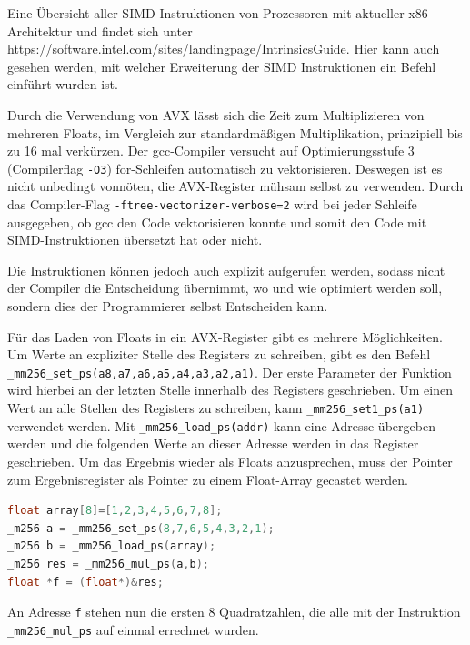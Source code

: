 \documentclass[../main.tex]{subfiles}
\begin{document}
Eine Übersicht aller SIMD-Instruktionen von Prozessoren mit aktueller x86-Architektur und findet sich unter \url{https://software.intel.com/sites/landingpage/IntrinsicsGuide}. Hier kann auch gesehen werden, mit welcher Erweiterung der SIMD Instruktionen ein Befehl einführt wurden ist.

Durch die Verwendung von AVX lässt sich die Zeit zum Multiplizieren von mehreren Floats, im Vergleich zur standardmäßigen Multiplikation, prinzipiell bis zu 16 mal verkürzen. Der gcc-Compiler versucht auf Optimierungsstufe 3 (Compilerflag \texttt{-O3}) for-Schleifen automatisch zu vektorisieren. Deswegen ist es nicht unbedingt vonnöten, die AVX-Register mühsam selbst zu verwenden. Durch das Compiler-Flag \texttt{-ftree-vectorizer-verbose=2} wird bei jeder Schleife ausgegeben, ob gcc den Code vektorisieren konnte und somit den Code mit SIMD-Instruktionen übersetzt hat oder nicht.

Die Instruktionen können jedoch auch explizit aufgerufen werden, sodass nicht der Compiler die Entscheidung übernimmt, wo und wie optimiert werden soll, sondern dies der Programmierer selbst Entscheiden kann. 

Für das Laden von Floats in ein AVX-Register gibt es mehrere Möglichkeiten. Um Werte an expliziter Stelle des Registers zu schreiben, gibt es den Befehl \texttt{\_mm256\_set\_ps(a8,a7,a6,a5,a4,a3,a2,a1)}. Der erste Parameter der Funktion wird hierbei an der letzten Stelle innerhalb des Registers geschrieben. Um einen Wert an alle Stellen des Registers zu schreiben, kann \texttt{\_mm256\_set1\_ps(a1)} verwendet werden. Mit \texttt{\_mm256\_load\_ps(addr)} kann eine Adresse übergeben werden und die folgenden Werte an dieser Adresse werden in das Register geschrieben. 
Um das Ergebnis wieder als Floats anzusprechen, muss der Pointer zum Ergebnisregister als Pointer zu einem Float-Array gecastet werden.

\begin{lstlisting}[language=c++, caption=Multiplikation mit AVX, captionpos=b, label=listing:avx, frame=single, linewidth=\textwidth, breaklines=true]
float array[8]=[1,2,3,4,5,6,7,8];
_m256 a = _mm256_set_ps(8,7,6,5,4,3,2,1);
_m256 b = _mm256_load_ps(array);
_m256 res = _mm256_mul_ps(a,b);
float *f = (float*)&res;
\end{lstlisting}
An Adresse \texttt{f} stehen nun die ersten 8 Quadratzahlen, die alle mit der Instruktion \texttt{\_mm256\_mul\_ps} auf einmal errechnet wurden.
\end{document}
